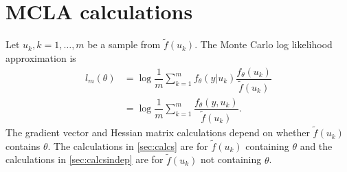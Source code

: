 \documentclass{article}
\begin{document}
%
%
%
%
%







\appendix
\section{MCLA calculations}
Let $u_k,k=1,\ldots,m$ be a sample from $\tilde{f}(u_k)$. The Monte Carlo log likelihood approximation is
\begin{align}
l_{m}(\theta) &=\log \dfrac{1}{m} \sum_{k=1}^mf_\theta(y|u_k)  \dfrac{ f_\theta(u_k)   }{\tilde{f}(u_k)}\\
&= \log \dfrac{1}{m} \sum_{k=1}^m  \dfrac{ f_\theta(y,u_k)   }{\tilde{f}(u_k)}.
\end{align}
The gradient vector and Hessian matrix calculations depend on whether $\tilde{f}(u_k)$ contains $\theta$. The calculations in \ref{sec:calcs} are for $\tilde{f}(u_k)$ containing $\theta$ and the calculations in \ref{sec:calcsindep} are for $\tilde{f}(u_k)$ not containing $\theta$.
\end{document}
